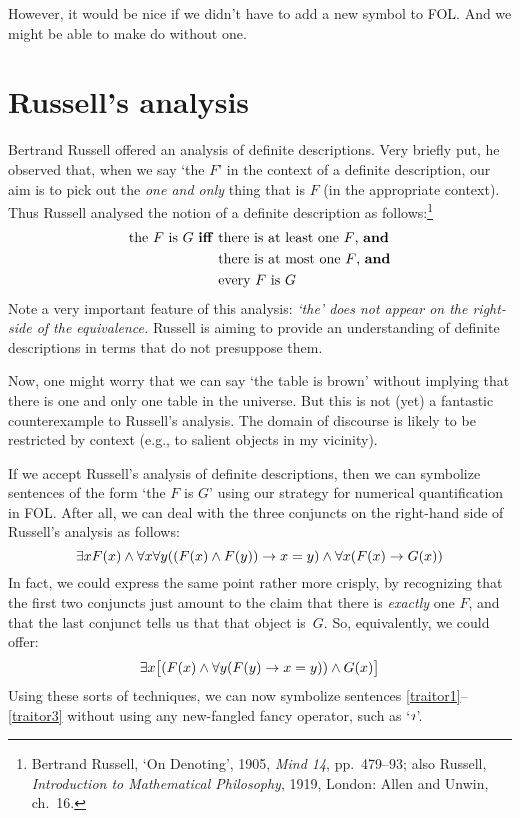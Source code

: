 However, it would be nice if we didn't have to add a new symbol to FOL. And we might be able to make do without one.

\section{Russell's analysis}
Bertrand Russell offered an analysis of definite descriptions. Very briefly put, he observed that, when we say `the $F$' in the context of a definite description, our aim is to pick out the \emph{one and only} thing that is $F$ (in the appropriate context). Thus Russell analysed the notion of a definite description as follows:\footnote{Bertrand Russell, `On Denoting', 1905, \emph{Mind 14}, pp.\ 479--93; also Russell, \emph{Introduction to Mathematical Philosophy}, 1919, London: Allen and Unwin, ch.\ 16.}
	\begin{align*}
		\text{the $F$ is $G$ \textbf{iff} }&\text{there is at least one $F$, \emph{and}}\\
	&\text{there is at most one $F$, \emph{and}}\\	
	&\text{every $F$ is $G$}
\end{align*}
Note a very important feature of this analysis: \emph{`the' does not appear on the right-side of the equivalence.} Russell is aiming to provide an understanding of definite descriptions in terms that do not presuppose them. 

Now, one might worry that we can say `the table is brown' without implying that there is one and only one table in the universe. But this is not (yet) a fantastic counterexample to Russell's analysis. The domain of discourse is likely to be restricted by context (e.g., to salient objects in my vicinity).

If we accept Russell's analysis of definite descriptions, then we can symbolize sentences of the form `the $F$ is $G$' using our strategy for numerical quantification in FOL. After all, we can deal with the three conjuncts on the right-hand side of Russell's analysis as follows:
	$$\exists x \atom{F}{x} \eand \forall x \forall y ((\atom{F}{x} \eand \atom{F}{y}) \eif x = y) \eand \forall x (\atom{F}{x} \eif \atom{G}{x})$$
In fact, we could express the same point rather more crisply, by recognizing that the first two conjuncts just amount to the claim that there is \emph{exactly} one $F$, and that the last conjunct tells us that that object is~$G$. So, equivalently, we could offer:
	$$\exists x \bigl[(\atom{F}{x} \eand \forall y (\atom{F}{y} \eif x = y)) \eand \atom{G}{x}\bigr]$$
Using these sorts of techniques, we can now symbolize sentences \ref{traitor1}--\ref{traitor3} without using any new-fangled fancy operator, such as `$\maththe$'. 


